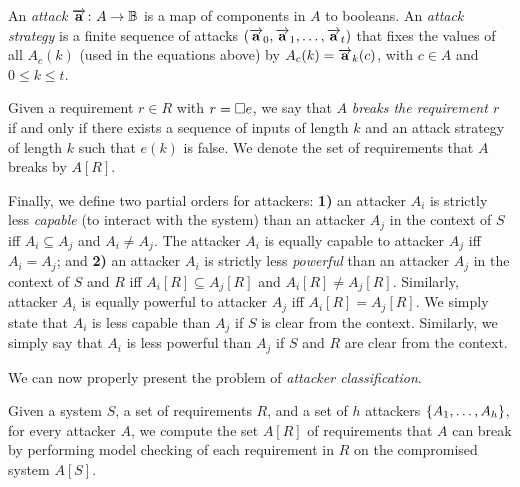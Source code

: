 {An \emph{attack} $\overrightarrow{\bf{a}}\colon A\rightarrow \mathbb{B}$ is a map of components in $A$ to booleans. An \emph{attack strategy} is a finite sequence of attacks $(\overrightarrow{\bf{a}}_0, \overrightarrow{\bf{a}}_1, \ldots, \overrightarrow{\bf{a}}_t)$ that fixes the values of all $A_c(k)$ (used in the equations above) by $A_c(k)=\overrightarrow{\bf{a}}_k(c)$, with $c\in A$ and $0 \leq k \leq t$. %
\begin{definition}
\label{def:brokenRequirement}
Given a requirement $r\in R$ with $r={{\square}} e$, we say that $A$ \emph{breaks the requirement $r$} if and only if there exists a sequence of inputs of length $k$ and an attack strategy of length $k$ such that $e(k)$ is false. We denote the set of requirements that $A$ breaks by  $A[R]$. 
\end{definition}
Finally, we define two partial orders for attackers: \textbf{1)} an attacker $A_i$ is strictly less \emph{capable} (to interact with the system) than an attacker $A_j$ in the 
context of $S$ %
iff $A_i\subseteq A_j$ and $A_i \neq A_j$. The {attacker $A_i$ is equally capable to attacker $A_j$ iff $A_i= A_j$}; and \textbf{2)} an attacker $A_i$ is strictly less \emph{powerful} than an attacker $A_j$ in the 
context of $S$ and $R$ %
iff $A_i[R]\subseteq A_j[R]$ and $A_i[R]\neq A_j[R]$. Similarly, {attacker $A_i$ is equally powerful to attacker $A_j$ iff $A_i[R]= A_j[R]$}. We simply state that $A_i$ is less capable than $A_j$ if $S$ is clear from the context. Similarly, we simply say that $A_i$ is less powerful than $A_j$ if $S$ and $R$ are clear from the context.

We can now properly present the problem of \emph{attacker classification}.
\begin{definition} 
\label{def:AttackerQuantification}
Given a system $S$, a set of requirements $R$, and a set of $h$ attackers 
$\left\{A_1, \ldots , A_h\right\}$, for every attacker $A$, we compute the set $A[R]$ of requirements that $A$ can break by performing model checking of each requirement in $R$ on the compromised system $A[S]$. 
\end{definition}

}
